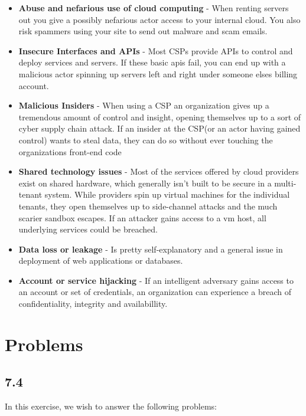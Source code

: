 \documentclass{article}
\begin{document}
\begin{itemize}
    \item \textbf{Abuse and nefarious use of cloud computing} - When renting servers
    out you give a possibly nefarious actor access to your internal cloud. You also
    risk spammers using your site to send out malware and scam emails.\\
    \item \textbf{Insecure Interfaces and APIs} - Most CSPs provide APIs to control
    and deploy services and servers. If these basic apis fail, you can end up with
    a malicious actor spinning up servers left and right under someone elses billing
    account.\\
    \item \textbf{Malicious Insiders} - When using a CSP an organization gives up a
    tremendous amount of control and insight, opening themselves up to a sort of
    cyber supply chain attack. If an insider at the CSP(or an actor having gained
    control) wants to steal data, they can do so without ever touching the organizations
    front-end code\\
    \item \textbf{Shared technology issues} - Most of the services offered by cloud
    providers exist on shared hardware, which generally isn't built to be secure
    in a multi-tenant system. While providers spin up virtual machines for the
    individual tenants, they open themselves up to side-channel attacks and the
    much scarier sandbox escapes. If an attacker gains access to a vm host, all
    underlying services could be breached.\\
    \item \textbf{Data loss or leakage} - Is pretty self-explanatory and a general
    issue in deployment of web applications or databases.\\
    \item \textbf{Account or service hijacking} - If an intelligent adversary gains
    access to an account or set of credentials, an organization can experience a breach
    of confidentiality, integrity and availabillity.\\
\end{itemize}


\section{Problems}

\subsection{7.4}
In this exercise, we wish to answer the following problems: \\
\end{document}
